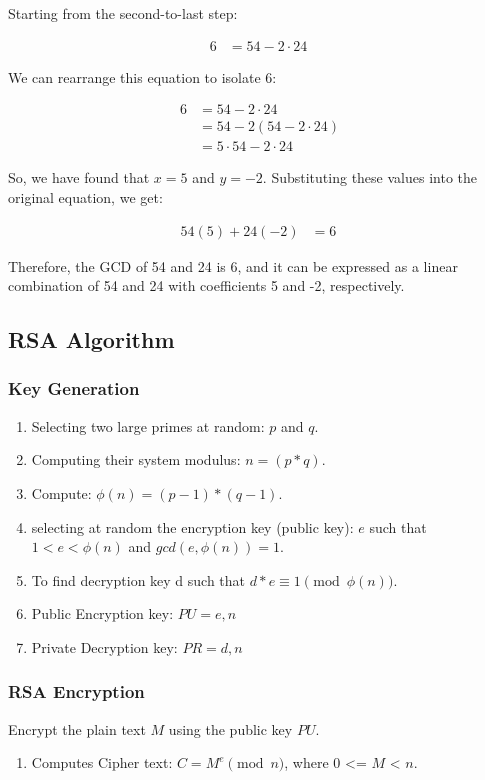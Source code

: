 \documentclass[11pt]{article}
\begin{document}
Starting from the second-to-last step:

\begin{align*}
	6 & = 54 - 2 \cdot 24 \
\end{align*}

We can rearrange this equation to isolate 6:

\begin{align*}
	6 & = 54 - 2 \cdot 24 \\
	  & = 54 - 2(54 - 2 \cdot 24) \\
	  & = 5 \cdot 54 - 2 \cdot 24
\end{align*}

So, we have found that $x = 5$ and $y = -2$. Substituting these values into the original equation, we get:

\begin{align*}
	54(5) + 24(-2) & = 6 \
\end{align*}

Therefore, the GCD of 54 and 24 is 6, and it can be expressed as a linear combination of 54 and 24 with coefficients 5 and -2, respectively.

\subsection{RSA Algorithm}
\subsubsection{Key Generation}
\begin{enumerate}
	\item Selecting two large primes at random: $p$ and $q$.
	\item Computing their system modulus: $n = (p*q)$.
	\item Compute: $\phi(n) = (p-1)*(q-1)$.
	\item selecting at random the encryption key (public key): $e$ such that $1 < e < \phi(n)$ and $gcd(e, \phi(n)) = 1$.
	\item To find decryption key d such that $d*e \equiv 1 \pmod{\phi(n)}$.
	\item Public Encryption key: $PU = {e, n}$
	\item Private Decryption key: $PR = {d, n}$
\end{enumerate}
\subsubsection{RSA Encryption}
Encrypt the plain text $M$ using the public key $PU$.
\begin{enumerate}
	\item Computes Cipher text: $C = M^e \pmod{n}$, where 0 <= $M$ < $n$.
\end{enumerate}
\end{document}
